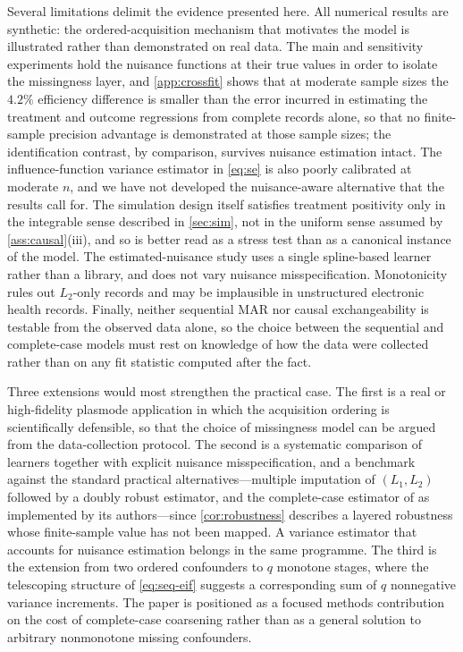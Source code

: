 \documentclass[11pt]{article}
\theoremstyle{definition}
\newcommand{\1}{\mathbf{1}}
\begin{document}
Several limitations delimit the evidence presented here. All numerical results
are synthetic: the ordered-acquisition mechanism that motivates the model is
illustrated rather than demonstrated on real data. The main and sensitivity
experiments hold the nuisance functions at their true values in order to isolate
the missingness layer, and \cref{app:crossfit} shows that at moderate sample
sizes the $4.2\%$ efficiency difference is smaller than the error incurred in
estimating the treatment and outcome regressions from complete records alone, so
that no finite-sample precision advantage is demonstrated at those sample sizes;
the identification contrast, by comparison, survives nuisance estimation intact.
The influence-function variance estimator in \cref{eq:se} is also poorly
calibrated at moderate $n$, and we have not developed the nuisance-aware
alternative that the results call for. The simulation design itself satisfies
treatment positivity only in the integrable sense described in \cref{sec:sim},
not in the uniform sense assumed by \cref{ass:causal}(iii), and so is better read
as a stress test than as a canonical instance of the model. The
estimated-nuisance study uses a single spline-based learner rather than a
library, and does not vary nuisance misspecification. Monotonicity
rules out $L_2$-only records and may be implausible in unstructured electronic
health records. Finally, neither sequential MAR nor causal exchangeability is
testable from the observed data alone, so the choice between the sequential and
complete-case models must rest on knowledge of how the data were collected
rather than on any fit statistic computed after the fact.

Three extensions would most strengthen the practical case. The first is a real
or high-fidelity plasmode application in which the acquisition ordering is
scientifically defensible, so that the choice of missingness model can be argued
from the data-collection protocol. The second is a systematic comparison of
learners together with explicit nuisance misspecification, and a benchmark
against the standard practical alternatives---multiple imputation of $(L_1,L_2)$
followed by a doubly robust estimator, and the complete-case estimator of
\citet{levis2025} as implemented by its authors---since \cref{cor:robustness}
describes a layered robustness whose finite-sample value has not been mapped. A
variance estimator that accounts for nuisance estimation belongs in the same
programme. The third is the extension from two ordered confounders to
$q$ monotone stages, where the telescoping structure of \cref{eq:seq-eif}
suggests a corresponding sum of $q$ nonnegative variance increments. The paper
is positioned as a focused methods contribution on the cost of complete-case
coarsening rather than as a general solution to arbitrary nonmonotone missing
confounders.
\end{document}
